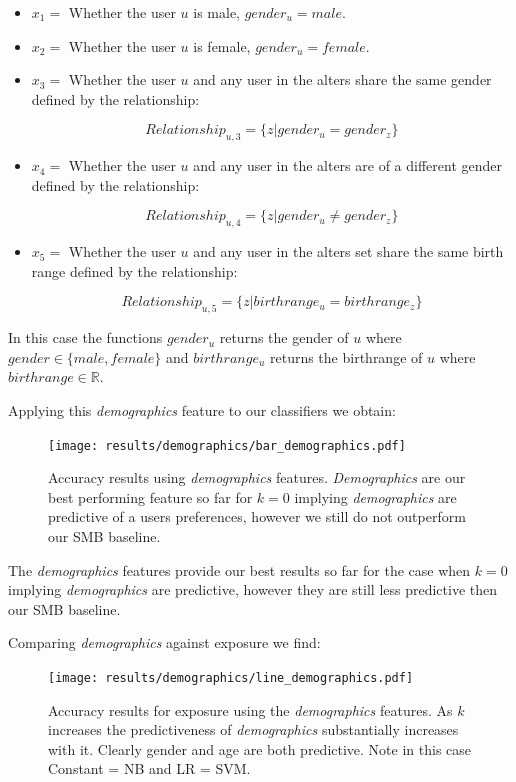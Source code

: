 \begin{itemize}
\item $x_1 = $ Whether the user $u$ is male, $gender_u = male$.
\item $x_2 = $ Whether the user $u$ is female, $gender_u = female$.
\item $x_3 = $ Whether the user $u$ and any user in the alters share the same gender defined by the relationship:

\[ Relationship_{u,3} = \{z | gender_u = gender_z\} \]

\item $x_4 = $ Whether the user $u$ and any user in the alters are of a different gender defined by the relationship:

\[ Relationship_{u,4} = \{z | gender_u \neq gender_z\} \]

\item $x_5 = $ Whether the user $u$ and any user in the alters set share the same birth range defined by the relationship:

\[ Relationship_{u,5} = \{z | birthrange_u = birthrange_z\} \]

\end{itemize}

In this case the functions $gender_{u}$ returns the gender of $u$ where $gender \in \{male, female\}$ and $birthrange_u$ returns 
the birthrange of $u$ where $birthrange \in \mathbb{R}$.

Applying this \emph{demographics} feature to our classifiers we obtain:

\begin{figure}[h]
	\begin{center}
		\texttt{[image: results/demographics/bar\_demographics.pdf]}
		\caption{Accuracy results using \emph{demographics} features. \emph{Demographics} are our best performing feature so far for $k=0$ implying \emph{demographics} are predictive of a users preferences, 
				 however we still do not outperform our SMB baseline.}
	\end{center}
\end{figure}

The \emph{demographics} features provide our best results so far for the case when $k=0$ implying \emph{demographics} are predictive, however they are still less predictive then 
our SMB baseline.

\clearpage
	
Comparing \emph{demographics} against exposure we find:
	
\begin{figure}[h]
	\begin{center}
		\texttt{[image: results/demographics/line\_demographics.pdf]}
		\caption{Accuracy results for exposure using the \emph{demographics} features. As $k$ increases the predictiveness of \emph{demographics} substantially 
				 increases with it. Clearly gender and age are both predictive. Note in this case Constant = NB and LR = SVM.}
	\end{center}
\end{figure}


